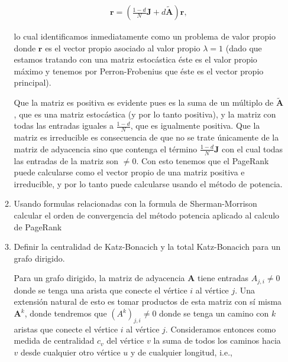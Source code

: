 \documentclass[answers]{exam}
\begin{document}
\begin{questions}
\begin{enumerate}
\begin{enumerate}
\begin{solution}
\begin{align*}
    \mathbf{r} = \left(\frac{1 - d}{N}\mathbf{J} + d\mathbf{\tilde{A}}\right)\mathbf{r},
\end{align*}

lo cual identificamos inmediatamente como un problema de valor propio donde $\mathbf{r}$ es el vector propio asociado al valor propio $\lambda = 1$ (dado que estamos tratando con una matriz estocástica éste es el valor propio máximo y tenemos por Perron-Frobenius que éste es el vector propio principal).

Que la matriz es positiva es evidente pues es la suma de un múltiplo de $\mathbf{\tilde{A}}$, que es una matriz estocástica (y por lo tanto positiva), y la matriz con todas las entradas iguales a $\frac{1 - d}{N}$, que es igualmente positiva. Que la matriz es irreducible es consecuencia de que no se trate únicamente de la matriz de adyacencia sino que contenga el término $\frac{1 - d}{N}\mathbf{J}$ con el cual todas las entradas de la matriz son $\neq 0$. Con esto tenemos que el PageRank puede calcularse como el vector propio de una matriz positiva e irreducible, y por lo tanto puede calcularse usando el método de potencia.
\end{solution}

\newpage

\item Usando formulas relacionadas con la formula de Sherman-Morrison calcular el orden de convergencia del método potencia aplicado al calculo de PageRank

\begin{solution}

\end{solution}

\item Definir la centralidad de Katz-Bonacich y la total Katz-Bonacich para un grafo dirigido.

\begin{solution}
Para un grafo dirigido, la matriz de adyacencia $\mathbf{A}$ tiene entradas $A_{j,i} \neq 0$ donde se tenga una arista que conecte el vértice $i$ al vértice $j$. Una extensión natural de esto es tomar productos de esta matriz con sí misma $\mathbf{A}^k$, donde tendremos que $(A^k)_{j,i} \neq 0$ donde se tenga un camino con $k$ aristas que conecte el vértice $i$ al vértice $j$. Consideramos entonces como medida de centralidad $c_v$ del vértice $v$ la suma de todos los caminos hacia $v$ desde cualquier otro vértice $u$ y de cualquier longitud, i.e.,


\end{solution}
\end{enumerate}
\end{enumerate}
\end{questions}
\end{document}
